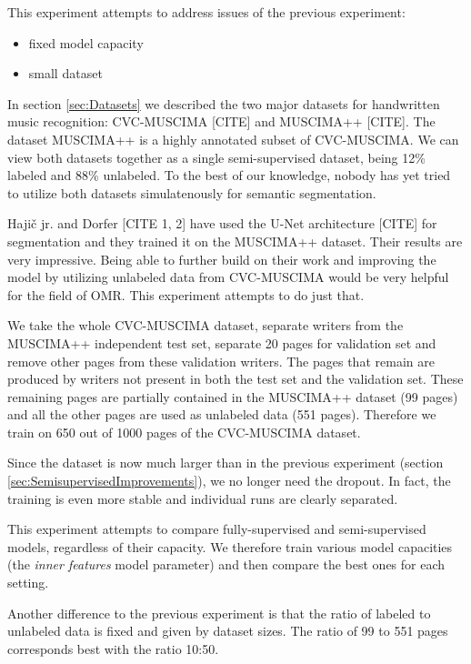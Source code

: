 This experiment attempts to address issues of the previous experiment:

\begin{itemize}
    \item fixed model capacity
    \item small dataset
\end{itemize}

In section \ref{sec:Datasets} we described the two major datasets for handwritten music recognition: CVC-MUSCIMA [CITE] and MUSCIMA++ [CITE]. The dataset MUSCIMA++ is a highly annotated subset of CVC-MUSCIMA. We can view both datasets together as a single semi-supervised dataset, being 12\% labeled and 88\% unlabeled. To the best of our knowledge, nobody has yet tried to utilize both datasets simulatenously for semantic segmentation.

Hajič jr. and Dorfer [CITE 1, 2] have used the U-Net architecture [CITE] for segmentation and they trained it on the MUSCIMA++ dataset. Their results are very impressive. Being able to further build on their work and improving the model by utilizing unlabeled data from CVC-MUSCIMA would be very helpful for the field of OMR. This experiment attempts to do just that.

We take the whole CVC-MUSCIMA dataset, separate writers from the MUSCIMA++ independent test set, separate 20 pages for validation set and remove other pages from these validation writers. The pages that remain are produced by writers not present in both the test set and the validation set. These remaining pages are partially contained in the MUSCIMA++ dataset (99 pages) and all the other pages are used as unlabeled data (551 pages). Therefore we train on 650 out of 1000 pages of the CVC-MUSCIMA dataset.

Since the dataset is now much larger than in the previous experiment (section \ref{sec:SemisupervisedImprovements}), we no longer need the dropout. In fact, the training is even more stable and individual runs are clearly separated.

This experiment attempts to compare fully-supervised and semi-supervised models, regardless of their capacity. We therefore train various model capacities (the \emph{inner features} model parameter) and then compare the best ones for each setting.

Another difference to the previous experiment is that the ratio of labeled to unlabeled data is fixed and given by dataset sizes. The ratio of 99 to 551 pages corresponds best with the ratio 10:50.

